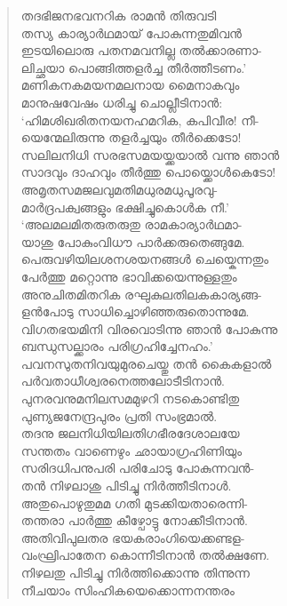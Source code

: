\begin{verse}
തദഭിജനഭവനറിക രാമന്‍ തിരുവടി\\
തസ്യ കാര്യാര്‍ഥമായ് പോകുന്നതുമിവന്‍\\
ഇടയിലൊരു പതനമവനില്ല തല്‍ക്കാരണാ-\\
ലിച്ഛയാ പൊങ്ങിത്തളര്‍ച്ച തീര്‍ത്തീടണം.’\\
മണികനകമയനമലനായ മൈനാകവും\\
മാനുഷവേഷം ധരിച്ചു ചൊല്ലീടിനാന്‍:\\
‘ഹിമശിഖരിതനയനഹമറിക, കപിവീര! നീ-\\
യെന്മേലിരുന്നു തളര്‍ച്ചയും തീര്‍ക്കെടോ!\\
സലിലനിധി സരഭസമയയ്ക്കയാല്‍ വന്നു ഞാന്‍\\
സാദവും ദാഹവും തീര്‍ത്തു പൊയ്ക്കൊള്‍കെടോ!\\
അമൃതസമജലവുമതിമധുരമധുപൂരവു-\\
മാര്‍ദ്രപക്വങ്ങളും ഭക്ഷിച്ചുകൊള്‍ക നീ.’\\
‘അലമലമിതരുതരുതു രാമകാര്യാര്‍ഥമാ-\\
യാശു പോകുംവിധൗ പാര്‍ക്കരുതെങ്ങുമേ.\\
പെരുവഴിയിലശനശയനങ്ങള്‍ ചെയ്കെന്നതും\\
പേര്‍ത്തു മറ്റൊന്നു ഭാവിക്കയെന്നുള്ളതും\\
അനുചിതമിതറിക രഘുകുലതിലകകാര്യങ്ങ-\\
ളന്‍പോടു സാധിച്ചൊഴിഞ്ഞരുതൊന്നുമേ.\\
വിഗതഭയമിനി വിരവൊടിന്നു ഞാന്‍ പോകുന്നു\\
ബന്ധുസല്ക്കാരം പരിഗ്രഹിച്ചേനഹം.’\\
പവനസുതനിവയുമുരചെയ്തു തന്‍ കൈകളാല്‍\\
പര്‍വതാധീശ്വരനെത്തലോടീടിനാന്‍.\\
പുനരവനുമനിലസമമുഴറി നടകൊണ്ടിതു\\
പുണ്യജനേന്ദ്രപുരം പ്രതി സംഭ്രമാല്‍.\\
തദനു ജലനിധിയിലതിഗഭീരദേശാലയേ\\
സന്തതം വാണെഴും ഛായാഗ്രഹിണിയും\\
സരിദധിപനുപരി പരിചോടു പോകുന്നവന്‍-\\
തന്‍ നിഴലാശു പിടിച്ചു നിര്‍ത്തീടിനാള്‍.\\
അതുപൊഴുതുമമ ഗതി മുടക്കിയതാരെന്നി-\\
തന്തരാ പാര്‍ത്തു കീഴ്പോട്ടു നോക്കീടിനാന്‍.\\
അതിവിപുലതര ഭയകരാംഗിയെക്കണ്ടള-\\
വംഘ്രിപാതേന കൊന്നീടിനാന്‍ തല്‍ക്ഷണേ.\\
നിഴലതു പിടിച്ചു നിര്‍ത്തിക്കൊന്നു തിന്നുന്ന\\
നീചയാം സിംഹികയെക്കൊന്നനന്തരം\\

\end{verse}
